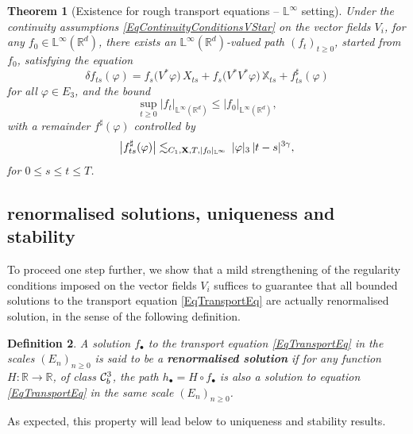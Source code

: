 \documentclass[11pt,a4paper]{amsart}
\newcommand{\RR}{\mathbb{R}}  \newcommand{\CC}{\mathbb{C}}  \newcommand{\LL}{\mathbb{L}}  \newcommand{\WW}{\mathbb{W}}
\newcommand{\bbX}{\mathbb{X}}
\renewcommand{\leq}{\leqslant}
\renewcommand{\geq}{\geqslant}
\newcommand{\ssk}{\smallskip}
\newtheorem{thm}{\hspace{-0.15cm}  {\sc Theorem} } %
\newtheorem{defn}[thm]{ \hspace{-0.3cm} {\sc Definition}}%
\numberwithin{equation}{section} %
\begin{document}
\ssk 
 
\begin{thm}[Existence for rough transport equations -- $\LL^\infty$ setting]
\label{ThmExistenceTransportEquationLInfty}
Under the continuity assumptions \eqref{EqContinuityConditionsVStar} on the vector fields $V_i$, for any $f_0\in\LL^\infty(\RR^d)$, there exists an $\LL^\infty(\RR^d)$-valued path $(f_t)_{t\geq 0}$, started from $f_0$, satisfying the equation
$$
\delta f_{ts}(\varphi) = f_s\big(V^*\varphi\big)\,X_{ts} + f_s\big(V^*V^*\varphi\big)\,\bbX_{ts} + f^\sharp_{ts}(\varphi)
$$
for all $\varphi\in E_3$, and the bound
$$ 
\sup_{t\geq 0} \big| f_t\big|_{\LL^\infty(\RR^d)}\leq \big| f_0\big|_{\LL^\infty(\RR^d)},
$$ 
with a remainder $f^\sharp(\varphi)$ controlled by 
\begin{equation}
\label{EqBoundRemainder-bis}
\big|f^\sharp_{ts}(\varphi) \big| \lesssim_{C_1,{\bfX}, T, |f_0|_{\LL^\infty}} \, |\varphi|_3\,|t-s|^{3\gamma},
\end{equation}
for $0\leq s\leq t\leq T$. 
\end{thm} 
 

\bigskip


\subsection{renormalised solutions, uniqueness and stability}
\label{SubsectionrenormalisedSolutions}

To proceed one step further, we show that a mild strengthening of the regularity conditions imposed on the vector fields $V_i$ suffices to guarantee that all bounded solutions to the transport equation \eqref{EqTransportEq} are actually renormalised solution, in the sense of the following definition. 

\begin{defn}
\label{DefnrenormalisedSolutions}
A solution $f_\bullet$ to the transport equation \eqref{EqTransportEq} in the scales $(E_n)_{n\geq 0}$ is said to be a \emph{\bf renormalised solution} if for any function $H : \RR\rightarrow\RR$, of class $\mathcal{C}^3_b$, the path $h_\bullet = H\circ f_\bullet$ is also a solution to equation \eqref{EqTransportEq} in the same scale $(E_n)_{n\geq 0}$.
\end{defn}

As expected, this property will lead below to uniqueness and stability results.
\end{document}
